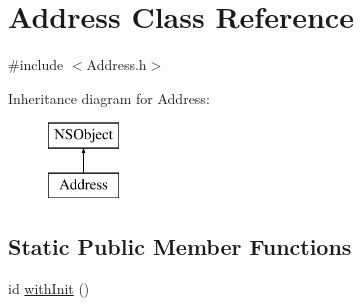 \hypertarget{interface_address}{
\section{\-Address \-Class \-Reference}
\label{interface_address}
}


{\ttfamily \#include $<$\-Address.\-h$>$}

\-Inheritance diagram for \-Address\-:\begin{figure}[H]
\begin{center}
\leavevmode
\includegraphics[height=2.000000cm]{interface_address}
\end{center}
\end{figure}
\subsection*{\-Static \-Public \-Member \-Functions}
\begin{DoxyCompactItemize}
\item 
id \hyperlink{interface_address_a560df2ef4291778ecec47ec8bc78a3ed}{with\-Init} ()
\end{DoxyCompactItemize}
